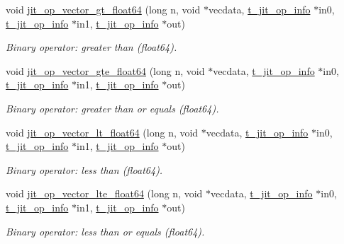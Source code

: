 \begin{DoxyCompactItemize}
void \hyperlink{group__opvecmod_ga803e8bd78c4e3644eb331831704f3ab7}{jit\_\-op\_\-vector\_\-gt\_\-float64} (long n, void $\ast$vecdata, \hyperlink{structt__jit__op__info}{t\_\-jit\_\-op\_\-info} $\ast$in0, \hyperlink{structt__jit__op__info}{t\_\-jit\_\-op\_\-info} $\ast$in1, \hyperlink{structt__jit__op__info}{t\_\-jit\_\-op\_\-info} $\ast$out)
\begin{DoxyCompactList}\small\item\em Binary operator: greater than (float64). \item\end{DoxyCompactList}\item 
void \hyperlink{group__opvecmod_ga2ed64ce3dc74e0c5b3500dba435c4df6}{jit\_\-op\_\-vector\_\-gte\_\-float64} (long n, void $\ast$vecdata, \hyperlink{structt__jit__op__info}{t\_\-jit\_\-op\_\-info} $\ast$in0, \hyperlink{structt__jit__op__info}{t\_\-jit\_\-op\_\-info} $\ast$in1, \hyperlink{structt__jit__op__info}{t\_\-jit\_\-op\_\-info} $\ast$out)
\begin{DoxyCompactList}\small\item\em Binary operator: greater than or equals (float64). \item\end{DoxyCompactList}\item 
void \hyperlink{group__opvecmod_gad2010efed21ed81ac35efb96a3ee65ec}{jit\_\-op\_\-vector\_\-lt\_\-float64} (long n, void $\ast$vecdata, \hyperlink{structt__jit__op__info}{t\_\-jit\_\-op\_\-info} $\ast$in0, \hyperlink{structt__jit__op__info}{t\_\-jit\_\-op\_\-info} $\ast$in1, \hyperlink{structt__jit__op__info}{t\_\-jit\_\-op\_\-info} $\ast$out)
\begin{DoxyCompactList}\small\item\em Binary operator: less than (float64). \item\end{DoxyCompactList}\item 
void \hyperlink{group__opvecmod_ga7fd4a4b51016115efe6f35273b00983a}{jit\_\-op\_\-vector\_\-lte\_\-float64} (long n, void $\ast$vecdata, \hyperlink{structt__jit__op__info}{t\_\-jit\_\-op\_\-info} $\ast$in0, \hyperlink{structt__jit__op__info}{t\_\-jit\_\-op\_\-info} $\ast$in1, \hyperlink{structt__jit__op__info}{t\_\-jit\_\-op\_\-info} $\ast$out)
\begin{DoxyCompactList}\small\item\em Binary operator: less than or equals (float64). \item\end{DoxyCompactList}\item 

\end{DoxyCompactItemize}
